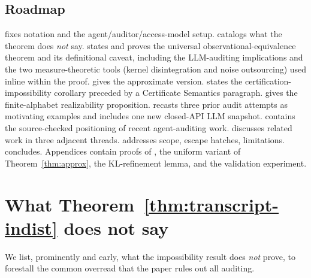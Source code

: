 \documentclass{article}
\theoremstyle{plain}
\theoremstyle{definition}
\theoremstyle{remark}
\begin{document}
\subsection{Roadmap}

 fixes notation and the agent/auditor/access-model setup.
 catalogs what the theorem does \emph{not} say.
 states and proves the universal observational-equivalence
theorem and its definitional caveat, including the LLM-auditing
implications and the two measure-theoretic tools (kernel disintegration
and noise outsourcing) used inline within the proof. 
gives the approximate version.  states the certification-impossibility
corollary preceded by a Certificate Semantics paragraph.
 gives the finite-alphabet realizability proposition.
 recasts three prior audit attempts as motivating
examples and includes one new closed-API LLM snapshot.
 contains the source-checked positioning of recent
agent-auditing work.  discusses related work in three
adjacent threads.  addresses scope, escape hatches,
limitations.  concludes. Appendices contain proofs of
, the uniform variant of Theorem~\ref{thm:approx},
the KL-refinement lemma, and the validation experiment.

\section{What Theorem~\ref{thm:transcript-indist} does not say}\label{sec:not-said}

We list, prominently and early, what the impossibility result does \emph{not} prove,
to forestall the common overread that the paper rules out all auditing.
\end{document}
